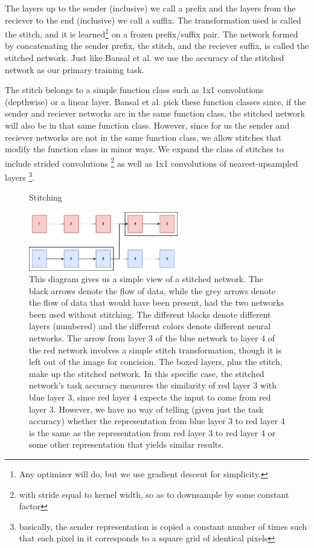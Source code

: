 \documentclass{article} %
\begin{document}
The layers up to the sender (inclusive) we call a prefix and the layers from the reciever to the end (inclusive) we call
a suffix. The transformation used is called the stitch, and it is learned\footnote{Any optimizer will do, but we use gradient descent for simplicity.}
on a frozen prefix/suffix pair. The network formed by concatenating the sender prefix, the stitch, and the reciever
suffix, is called the stitched network. Just like Bansal et al. we use the accuracy of the stitched network as our
primary training task.

The stitch belongs to a simple function class such as 1x1 convolutions (depthwise) or
a linear layer. Bansal et al. pick these function classes since, if the sender and reciever networks are in the same
function class, the stitched network will also be in that same function class. However, since for us the sender and
reciever networks are not in the same function class, we allow stitches that modify the function class in minor ways.
We expand the class of stitches to include strided convolutions \footnote{with stride equal to kernel width, so as to downsample
by some constant factor} as well as 1x1 convolutions of nearest-upsampled layers \footnote{basically, the sender representation
is copied a constant number of times such that each pixel in it corresponds to a square grid of identical pixels}.

\begin{center}
   \begin{figure}[h!]
      \centering
      \caption{Stitching}
      \includegraphics[width=6.5cm]{stitch.jpg}
      \caption*{This diagram gives us a simple view of a stitched network. The black arrows denote the flow of data, while
      the grey arrows denote the flow of data that would have been present, had the two networks been used without stitching.
      The different blocks denote different layers (numbered) and the different colors denote different neural networks. The arrow
      from layer 3 of the blue network to layer 4 of the red network involves a simple stitch transformation, though it is left
      out of the image for concision. The boxed layers, plus the stitch, make up the stitched network. In this specific case,
      the stitched network's task accuracy measures the similarity of red layer 3 with blue layer 3, since red layer 4 expects the
      input to come from red layer 3. However, we have no way of telling (given just the task accuracy) whether the representation
      from blue layer 3 to red layer 4 is the same as the representation from red layer 3 to red layer 4 or some other representation
      that yields similar results.}
   \end{figure}
\end{center}
\end{document}

